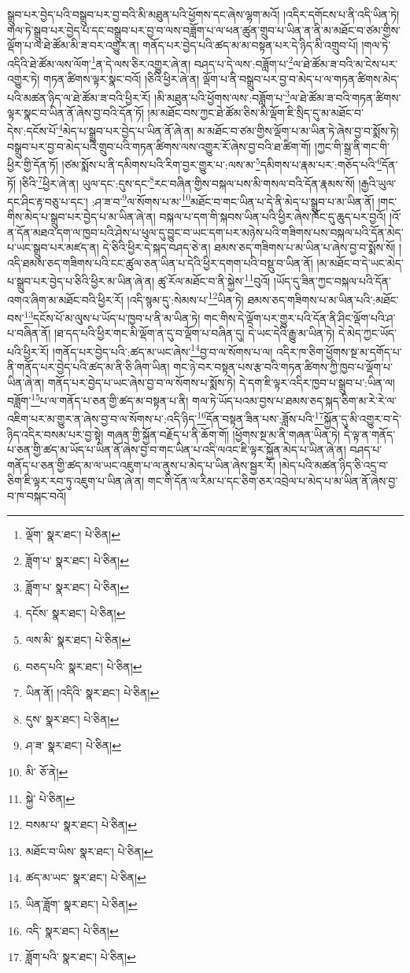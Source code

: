 སྒྲུབ་པར་བྱེད་པའི་བསྒྲུབ་པར་བྱ་བའི་མི་མཐུན་པའི་ཕྱོགས་དང་ཞེས་ལྷག་མའོ། །འདིར་དགོངས་པ་ནི་འདི་ཡིན་ཏེ། གལ་ཏེ་སྒྲུབ་པར་བྱེད་པ་དང་བསྒྲུབ་པར་བྱ་བ་ལས་བཟློག་པ་ལ་ཕན་ཚུན་གྲུབ་པ་ཡིན་ན་ནི་མ་མཐོང་བ་ཙམ་གྱིས་ལྡོག་པ་ལ་ཐེ་ཚོམ་མི་ཟ་བར་འགྱུར་ན། གནོད་པར་བྱེད་པའི་ཚད་མ་མ་བསྟན་པར་དེ་ཉིད་མི་འགྲུབ་པོ། །གལ་ཏེ་འདིའི་ཐེ་ཚོམ་ལས་ལོག་\footnote{ལྡོག་  སྣར་ཐང་།  པེ་ཅིན། }ན་དེ་ལས་ཅིར་འགྱུར་ཞེ་ན། བཤད་པ་དེ་ལས་:བཟློག་པ་\footnote{ཟློག་པ་  སྣར་ཐང་།  པེ་ཅིན། }ལ་ཐེ་ཚོམ་ཟ་བའི་མ་ངེས་པར་འགྱུར་ཏེ། གཏན་ཚིགས་ལྟར་སྣང་བའོ། །ཅིའི་ཕྱིར་ཞེ་ན། ལྡོག་པ་ནི་བསྒྲུབ་པར་བྱ་བ་མེད་པ་ལ་གཏན་ཚིགས་མེད་པའི་མཚན་ཉིད་ལ་ཐེ་ཚོམ་ཟ་བའི་ཕྱིར་རོ། །མི་མཐུན་པའི་ཕྱོགས་ལས་:བཟློག་པ་\footnote{ཟློག་པ་  སྣར་ཐང་།  པེ་ཅིན། }ལ་ཐེ་ཚོམ་ཟ་བའི་གཏན་ཚིགས་ལྟར་སྣང་བ་ཡིན་ནོ་ཞེས་བྱ་བའི་དོན་ཏོ། །མ་མཐོང་བས་ཀྱང་ཐེ་ཚོམ་ཅིས་མི་ལྡོག་ཇི་སྲིད་དུ་མ་མཐོང་བ་དེས་:དངོས་པོ་\footnote{དངོས་  སྣར་ཐང་།  པེ་ཅིན། }མེད་པ་སྒྲུབ་པར་བྱེད་པ་ཡིན་ནོ་ཞེ་ན། མ་མཐོང་བ་ཙམ་གྱིས་ལྡོག་པ་མ་ཡིན་ཏེ་ཞེས་བྱ་བ་སྨོས་ཏེ། བསྒྲུབ་པར་བྱ་བ་མེད་པའི་གྲུབ་པའི་གཏན་ཚིགས་ལས་འགྱུར་རོ་ཞེས་བྱ་བའི་ཐ་ཚིག་གོ། །ཀྱང་གི་སྒྲ་ནི་གང་གི་ཕྱིར་གྱི་དོན་ཏོ། །ཙམ་སྨོས་པ་ནི་དམིགས་པའི་རིག་བྱར་གྱུར་པ་:ལས་མ་\footnote{ལས་མི་  སྣར་ཐང་།  པེ་ཅིན། }དམིགས་པ་རྣམ་པར་:གཅོད་པའི་\footnote{བཅད་པའི་  སྣར་ཐང་།  པེ་ཅིན། }དོན་ཏོ། །ཅིའི་\footnote{ཡིན་ནོ། །འདིའི་  སྣར་ཐང་།  པེ་ཅིན། }ཕྱིར་ཞེ་ན། ཡུལ་དང་:དུས་དང་\footnote{དུས་  སྣར་ཐང་།  པེ་ཅིན། }རང་བཞིན་གྱིས་བསྐལ་པས་མི་གསལ་བའི་དོན་རྣམས་སོ། །རྒྱའི་ཡུལ་དང་ཤིང་རྟ་བཅུ་པ་དང་། :ཤ་ཟ་བ་\footnote{ཤ་ཟ་  སྣར་ཐང་།  པེ་ཅིན། }ལ་སོགས་པ་མ་\footnote{མི་  ཅོ་ནེ། }མཐོང་བ་གང་ཡིན་པ་དེ་ནི་མེད་པ་སྒྲུབ་པ་མ་ཡིན་ནོ། །གང་གིས་མེད་པ་སྒྲུབ་པར་བྱེད་པ་མ་ཡིན་ཞེ་ན། བསྐལ་པ་དག་གི་སྐབས་ཡིན་པའི་ཕྱིར་ཞེས་ཁོང་དུ་ཆུད་པར་བྱའོ། །འོ་ན་དོན་མཐའ་དག་ལ་ཁྱབ་པའི་ཤེས་པ་ཕུལ་དུ་བྱུང་བ་ཡང་དག་པར་མཉེས་པའི་གཟིགས་པས་བསྐལ་པའི་དོན་མེད་པ་ཡང་སྒྲུབ་པར་མཛད་ན། དེ་ཅིའི་ཕྱིར་དེ་སྐད་བཤད་ཅེ་ན། ཐམས་ཅད་གཟིགས་པ་མ་ཡིན་པ་ཞེས་བྱ་བ་སྨོས་སོ། །འདི་ཐམས་ཅད་གཟིགས་པའི་ངང་ཚུལ་ཅན་ཡིན་པ་དེའི་ཕྱིར་དགག་པའི་བསྡུ་བ་ཡིན་ནོ། །མ་མཐོང་བ་དེ་ཡང་མེད་པ་སྒྲུབ་པར་བྱེད་པ་ཅིའི་ཕྱིར་མ་ཡིན་ཞེ་ན། ཚུ་རོལ་མཐོང་བ་ནི་སྐྱེས་\footnote{སྐྱེ་  པེ་ཅིན། }བུའོ། །ཡོད་དུ་ཟིན་ཀྱང་བསྐལ་པའི་དོན་འགའ་ཞིག་མ་མཐོང་བའི་ཕྱིར་རོ། །འདི་སྙམ་དུ་:སེམས་པ་\footnote{བསམ་པ་  སྣར་ཐང་།  པེ་ཅིན། }ཡིན་ཏེ། ཐམས་ཅད་གཟིགས་པ་མ་ཡིན་པའི་:མཐོང་བས་\footnote{མཐོང་བ་ཡིས་  སྣར་ཐང་།  པེ་ཅིན། }དངོས་པོ་མ་ལུས་པ་ཡོད་པ་ཁྱབ་པ་ནི་མ་ཡིན་ཏེ། གང་གིས་དེ་ལྡོག་པར་གྱུར་པའི་དོན་ནི་ཤིང་ལྡོག་པའི་ཤ་པ་བཞིན་ནོ། །ཐ་དད་པའི་ཕྱིར་གང་མི་ལྡོག་ན་དུ་བ་ལྡོག་པ་བཞིན་དུ། དེ་ཡང་དེའི་རྒྱུ་མ་ཡིན་ཏེ། དེ་མེད་ཀྱང་ཡོད་པའི་ཕྱིར་རོ། །གནོད་པར་བྱེད་པའི་:ཚད་མ་ཡང་ཞེས་\footnote{ཚད་མ་ཡང་  སྣར་ཐང་།  པེ་ཅིན། }བྱ་བ་ལ་སོགས་པ་ལ། འདིར་ཁ་ཅིག་ཕྱོགས་སྔ་མ་དགོད་པ་ནི་གནོད་པར་བྱེད་པའི་ཚད་མ་ནི་ཅི་ཞིག་ཡིན། གང་ཉེ་བར་བསྟན་པས་རྩ་བའི་གཏན་ཚིགས་ཀྱི་ཁྱབ་པ་ལྡོག་པ་ཡིན་ཞེ་ན། གནོད་པར་བྱེད་པ་ཡང་ཞེས་བྱ་བ་ལ་སོགས་པ་སྨོས་ཏེ། དེ་དག་ཇི་ལྟར་འདིར་ཁྱབ་པ་སྒྲུབ་པ་:ཡིན་ལ། བཟློག་\footnote{ཡིན་ཟློག་  སྣར་ཐང་།  པེ་ཅིན། }པ་ལ་གནོད་པ་ཅན་གྱི་ཚད་མ་བསྟན་པ་ནི། གལ་ཏེ་ཡོད་པའམ་བྱས་པ་ཐམས་ཅད་སྐད་ཅིག་མ་རེ་རེ་ལ་འཇིག་པར་མ་གྱུར་ན་ཞེས་བྱ་བ་ལ་སོགས་པ་:འདི་ཉིད་\footnote{འདི་  སྣར་ཐང་།  པེ་ཅིན། }དོན་བསྟན་ཟིན་པས་:ཟློས་པའི་\footnote{ཟློག་པའི་  སྣར་ཐང་།  པེ་ཅིན། }སྐྱོན་དུ་མི་འགྱུར་བ་དེ་ཉིད་འདིར་བསམ་པར་བྱ་སྟེ། གཞན་གྱི་སྐྱོན་བརྗོད་པ་ནི་ཆོག་གོ། །ཕྱོགས་སྔ་མ་ནི་གཞན་ཡིན་ཏེ། དེ་ལྟ་ན་གནོད་པ་ཅན་གྱི་ཚད་མ་ཡོད་པ་ཡིན་ནོ་ཞེས་བྱ་བ་གང་ཡིན་པ་འདི་ལའང་ཇི་ལྟར་སྐྱོན་མེད་པ་ཡིན་ཞེ་ན། བཤད་པ་གནོད་པ་ཅན་གྱི་ཚད་མ་ལ་ཡང་འཇུག་པ་ལ་ནུས་པ་མེད་པ་ཡིན་ཞེས་སྦྱར་རོ། །མེད་པའི་མཚན་ཉིད་ཅི་འདྲ་བ་ཅིག་ཇི་ལྟར་རབ་ཏུ་འཇུག་པ་ཡིན་ཞེ་ན། གང་གི་དོན་ལ་རིམ་པ་དང་ཅིག་ཅར་འབྲེལ་པ་མེད་པ་མ་ཡིན་ནོ་ཞེས་བྱ་བ་ཁ་བསྐང་བའོ། 